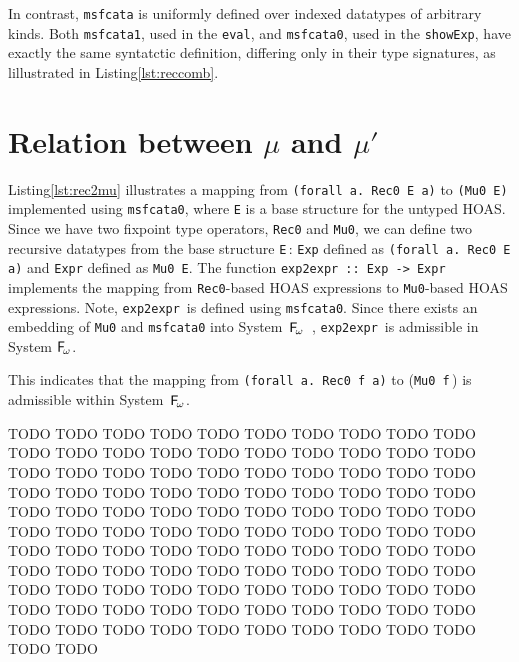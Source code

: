 \documentclass[a4paper,UKenglish]{lipics}
\newcommand{\Fw}[0]{{\ensuremath{\mathsf{\uppercase{F}}_{\!\omega}}}}
\begin{document}
In contrast, \lstinline{msfcata} is uniformly defined over indexed datatypes of
arbitrary kinds. Both \lstinline{msfcata1}, used in the \lstinline{eval},
and \lstinline{msfcata0}, used in the \lstinline{showExp}, have exactly
the same syntatctic definition, differing only in their type signatures,
as lillustrated in Listing\;\ref{lst:reccomb}.

\section{Relation between $\mu$ and $\mu'$}
Listing\;\ref{lst:rec2mu} illustrates a mapping from
\lstinline{(forall a. Rec0 E a)}  to \lstinline{(Mu0 E)} implemented
using \lstinline{msfcata0}, where \lstinline{E} is a base structure
for the untyped HOAS. Since we have two fixpoint type operators,
\lstinline{Rec0} and \lstinline{Mu0}, we can define two recursive datatypes
from the base structure \lstinline{E}\,:
\lstinline{Exp} defined as \lstinline{(forall a. Rec0 E a)} and
\lstinline{Expr} defined as \lstinline{Mu0 E}.
The function \lstinline{exp2expr :: Exp -> Expr}\, implements the mapping from
\lstinline{Rec0}-based HOAS expressions to \lstinline{Mu0}-based
HOAS expressions. Note, \lstinline{exp2expr}\, is defined
using \lstinline{msfcata0}.  Since there exists an embedding of
\lstinline{Mu0} and \lstinline{msfcata0} into System~\Fw\ \cite{AhnShe11},
\lstinline{exp2expr}\, is admissible in System \Fw.


This indicates that the mapping
from \lstinline{(forall a. Rec0 f a)} to (\lstinline{Mu0 f}\,) is admissible
within System~\Fw.


TODO TODO TODO TODO TODO TODO TODO TODO TODO TODO TODO TODO TODO TODO
TODO TODO TODO TODO TODO TODO TODO TODO TODO TODO TODO TODO TODO TODO
TODO TODO TODO TODO TODO TODO TODO TODO TODO TODO TODO TODO TODO TODO
TODO TODO TODO TODO TODO TODO TODO TODO TODO TODO TODO TODO TODO TODO
TODO TODO TODO TODO TODO TODO TODO TODO TODO TODO TODO TODO TODO TODO
TODO TODO TODO TODO TODO TODO TODO TODO TODO TODO TODO TODO TODO TODO
TODO TODO TODO TODO TODO TODO TODO TODO TODO TODO TODO TODO TODO TODO
TODO TODO TODO TODO TODO TODO TODO TODO TODO TODO TODO TODO TODO TODO


\begin{figure}

\vspace*{-3ex}
\end{figure}
\end{document}
